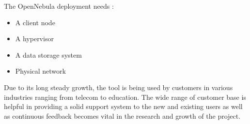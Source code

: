 The OpenNebula deployment needs :
\begin{itemize}
\item        A client node
\item        A hypervisor
\item        A data storage system
\item        Physical network
\end{itemize}

Due to its long steady growth, the tool is being used by customers in various industries ranging from telecom to education.
The wide range of customer base is helpful in providing a solid support system to the new and existing users as well as continuous
feedback becomes vital in the research and growth of the project. 

